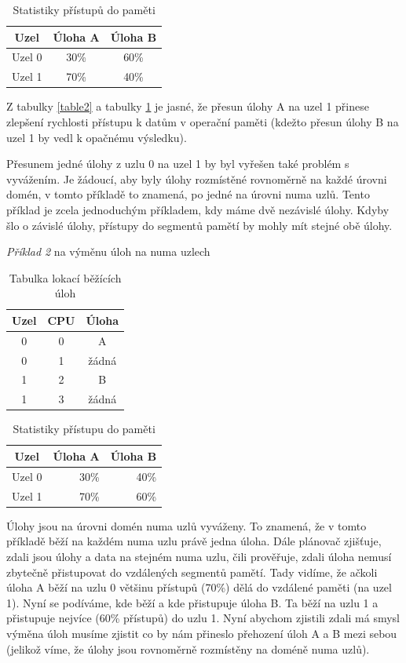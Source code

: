 \documentclass[a4paper,12pt]{article}
\begin{document}
\begin{table}[h]
\centering
\begin{tabular}{|c|c|c|}
\hline
Uzel & Úloha A & Úloha B \\
\hline
Uzel 0 & 30\% & 60\% \\
\hline
Uzel 1 & 70\% & 40\% \\
\hline
\end{tabular}
\caption{Statistiky přístupů do paměti}
\label{table3}
\end{table}

Z tabulky \ref{table2} a tabulky \ref{table3} je jasné, že přesun úlohy A na uzel 1 přinese zlepšení rychlosti přístupu k datům v operační paměti (kdežto přesun úlohy B na uzel 1 by vedl k opačnému výsledku).

Přesunem jedné úlohy z uzlu 0 na uzel 1 by byl vyřešen také problém s vyvážením. Je žádoucí, aby byly úlohy rozmístěné rovnoměrně na každé úrovni domén, v tomto příkladě to znamená, po jedné na úrovni numa uzlů. Tento příklad je zcela jednoduchým příkladem, kdy máme dvě nezávislé úlohy. Kdyby šlo o závislé úlohy, přístupy do segmentů pamětí by mohly mít stejné obě úlohy.

\newpage
\noindent
\textit{Příklad 2} na výměnu úloh na numa uzlech

\begin{table}[h]
\centering
\begin{tabular}{|c|c|c|}
\hline
Uzel & CPU & Úloha \\
\hline
0 & 0 & A \\
\hline
0 & 1 & žádná  \\
\hline
1 & 2 & B \\
\hline
1 & 3 & žádná \\
\hline
\end{tabular}
\caption{Tabulka lokací běžících úloh}
\label{table4}
\end{table}

\begin{table}[h]
\centering
\begin{tabular}{|c|r|r|}
\hline
Uzel & Úloha A & Úloha B \\
\hline
Uzel 0 & 30\% & 40\% \\
\hline
Uzel 1 & 70\% & 60\% \\
\hline
\end{tabular}
\caption{Statistiky přístupu do paměti}
\label{table5}
\end{table}

Úlohy jsou na úrovni domén numa uzlů vyváženy. To znamená, že v tomto příkladě běží na každém numa uzlu právě jedna úloha. Dále plánovač zjišťuje, zdali jsou úlohy a data na stejném numa uzlu, čili prověřuje, zdali úloha nemusí zbytečně přistupovat do vzdálených segmentů pamětí.  Tady vidíme, že ačkoli úloha A běží na uzlu 0 většinu přístupů (70\%) dělá do vzdálené paměti (na uzel 1). Nyní se podíváme, kde běží a kde přistupuje úloha B. Ta běží na uzlu 1 a přistupuje nejvíce (60\% přístupů) do uzlu 1. Nyní abychom zjistili zdali má smysl výměna úloh musíme zjistit co by nám přineslo přehození úloh A a B mezi sebou (jelikož víme, že úlohy jsou rovnoměrně rozmístěny na doméně numa uzlů).
\end{document}
